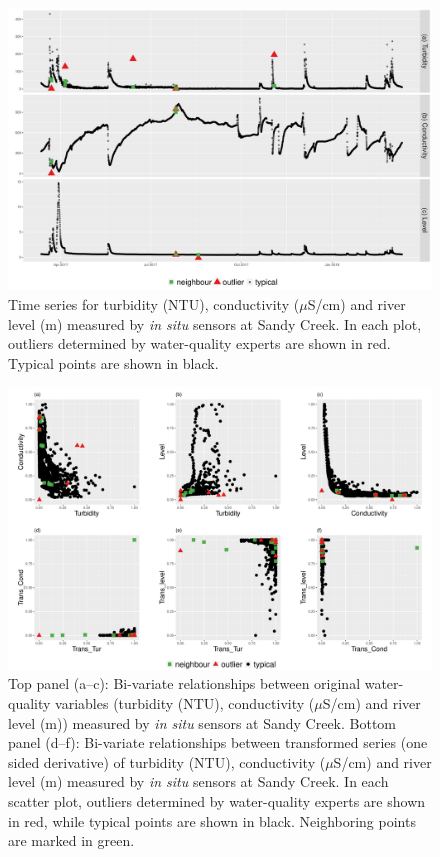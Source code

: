 \documentclass[draft]{agujournal2018} %
\begin{document}
\begin{figure}[H]

{\centering \includegraphics[width=1\textwidth]{./fig/transDemoTCLoriginal-1.pdf}

}

\caption{Time series for turbidity (NTU), conductivity ($\mu$S/cm) and river level (m) measured by \textit{in situ} sensors at Sandy Creek. In each plot, outliers determined by water-quality experts are shown in red. Typical points are shown in black.}\label{fig:VisualiseOutlierPng}
\end{figure}

\begin{figure}[H]

{\centering \includegraphics[width=1\textwidth]{./fig/VisualiseOutlierPairsTransData-1.pdf}

}

\caption{Top panel (a--c): Bi-variate relationships between original water-quality variables (turbidity (NTU), conductivity ($\mu$S/cm) and river level (m)) measured by \textit{in situ} sensors at Sandy Creek. Bottom panel (d--f): Bi-variate relationships between transformed series (one sided derivative) of turbidity (NTU), conductivity ($\mu$S/cm) and river level (m) measured by \textit{in situ} sensors at Sandy Creek. In each scatter plot, outliers determined by water-quality experts are shown in red, while typical points are shown in black. Neighboring points are marked in green.}\label{fig:VisualiseOutlierPairsTransDataPng}
\end{figure}
\end{document}
